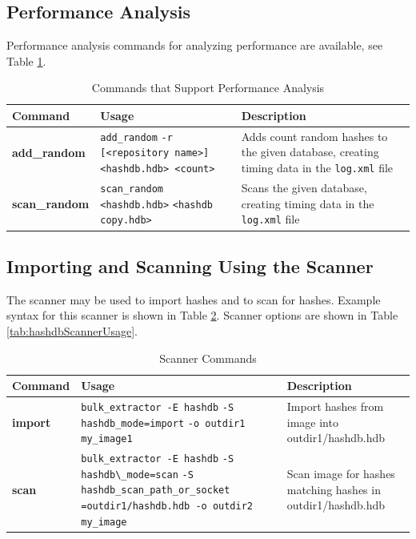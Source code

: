 \documentclass[11pt,fleqn]{article} %
\begin{document}
\subsection{Performance Analysis}
Performance analysis commands for analyzing \hash performance are available, see Table \ref{tab:analysis}.

\begin{table}[!ht]
\centering
\caption{Commands that Support \hdb Performance Analysis}
\label{tab:analysis}
\begin{tabular}{|p{3.5 cm}|p{6 cm}|p{4 cm}|}
\hline \hline
\textbf{Command} & \textbf{Usage} & \textbf{Description} \\
\hline
\textbf{add\_random} & \verb+add_random+ \verb+-r [<repository name>]+ \verb+<hashdb.hdb> <count>+ & Adds count random hashes to the given database, creating timing data in the \texttt{log.xml} file\\
\hline
\textbf{scan\_random} & \verb+scan_random <hashdb.hdb>+ \verb+<hashdb copy.hdb>+ & Scans the given database, creating timing data in the \texttt{log.xml} file\\
\hline
\end{tabular}
\end{table}

\subsection{Importing and Scanning Using the \bulk \hash Scanner}
\label{ImportingAndScanning}
The \bulk \hash scanner may be used to import hashes and to scan for hashes.
Example syntax for this scanner is shown in Table \ref{tab:hashdbScanner}.
Scanner options are shown in Table \ref{tab:hashdbScannerUsage}.

\begin{table}[!ht]
\centering
\caption{\bulk \hash Scanner Commands}
\label{tab:hashdbScanner}
\begin{tabular}{|p{3.5 cm}|p{6 cm}|p{4 cm}|}
\hline \hline
\textbf{Command} & \textbf{Usage} & \textbf{Description} \\
\hline
\textbf{import} & \verb+bulk_extractor -E hashdb+ \verb+-S hashdb_mode=import+ \verb+-o outdir1 my_image1+ & Import hashes from image into outdir1/hashdb.hdb\\
\hline
\textbf{scan} & \verb+bulk_extractor -E hashdb+ \verb+-S hashdb\_mode=scan+ \verb+-S hashdb_scan_path_or_socket+ \verb+=outdir1/hashdb.hdb -o outdir2+ \verb+my_image+ & Scan image for hashes matching hashes in outdir1/hashdb.hdb\\
\hline
\end{tabular}
\end{table}
\end{document}
